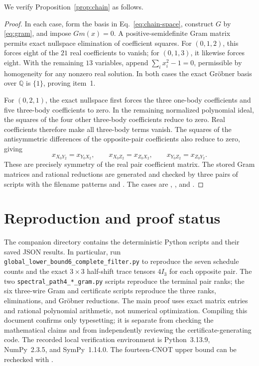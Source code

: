 \documentclass[11pt]{article}
\begin{document}
We verify Proposition~\ref{prop:chain} as follows.
\begin{proof}
In each case, form the basis in Eq.~\eqref{eq:chain-space}, construct
$G$ by \eqref{eq:gram}, and impose $Gm(x)=0$.  A positive-semidefinite
Gram matrix permits exact nullspace elimination of coefficient squares.
For $(0,1,2)$, this forces eight of the $21$ real coefficients to vanish;
for $(0,1,3)$, it likewise forces eight.  With the remaining $13$
variables, append $\sum_i x_i^2-1=0$, permissible by homogeneity for
any nonzero real solution.  In both cases the exact Gr\"obner basis over
$\mathbb Q$ is $\{1\}$, proving item~1.

For $(0,2,1)$, the exact nullspace first forces the three one-body
coefficients and five three-body coefficients to zero.  In the remaining
normalized polynomial ideal, the squares of the four other three-body
coefficients reduce to zero.  Real coefficients therefore make all
three-body terms vanish.  The squares of the antisymmetric differences
of the opposite-pair coefficients also reduce to zero, giving
\begin{equation}\label{eq:symmetric}
x_{X_0Y_2}=x_{Y_0X_2},\qquad
x_{X_0Z_2}=x_{Z_0X_2},\qquad
x_{Y_0Z_2}=x_{Z_0Y_2}.
\end{equation}
These are precisely symmetry of the real pair coefficient matrix.
The stored Gram matrices and rational reductions are generated and
checked by three pairs of scripts with the filename patterns
 and
.
The cases are , , and
.
\end{proof}
\section{Reproduction and proof status}

The companion directory contains the deterministic Python scripts and
their saved JSON results.  In particular, run
\texttt{global\_lower\_bound6\_complete\_filter.py} to reproduce
the seven schedule counts and the exact $3\times3$ half-shift trace
tensors $4I_3$ for each opposite pair.  The two
\texttt{spectral\_path4\_*\_gram.py} scripts reproduce the terminal
pair ranks; the six three-wire Gram and certificate scripts reproduce
the three ranks, eliminations, and Gr\"obner reductions.  The main
proof uses exact matrix entries and rational polynomial arithmetic,
not numerical optimization.  Compiling this document confirms only
typesetting; it is separate from checking the mathematical claims and
from independently reviewing the certificate-generating code.
The recorded local verification environment is Python~3.13.9,
NumPy~2.3.5, and SymPy~1.14.0.  The fourteen-CNOT upper bound can be
rechecked with .
\end{document}
